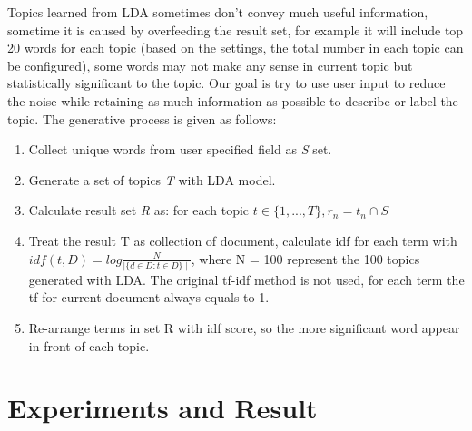 \documentclass[11pt,twoside]{report}
\begin{document}
Topics learned from LDA sometimes don’t convey much useful information, sometime it is caused by overfeeding the result set, for example it will include top 20 words for each topic (based on the settings, the total number in each topic can be configured), some words may not make any sense in current topic but statistically significant to the topic. Our goal  is try to use user input to reduce the noise while retaining as much information as possible to describe or label the topic. The generative process is given as follows: 
\begin{enumerate}
\item Collect unique words from user specified field as \textit{S} set.
\item Generate a set of topics \textit{T} with LDA model.
\item Calculate result set \textit{R} as: for each topic $t\in\{1,...,T\}, r_n = t_n \cap S$
\item Treat the result T as collection of document, calculate idf for each term with $idf(t, D) = log\frac{N}{\mid \{d\in D : t\in D\}\mid}$, where N = 100 represent the 100 topics generated with LDA. The original tf-idf method is not used, for each term the tf for current document always equals to 1. 
\item Re-arrange terms in set R with idf score, so the more significant word appear in front of each topic.
\end{enumerate}

\chapter{Experiments and Result}
\end{document}
